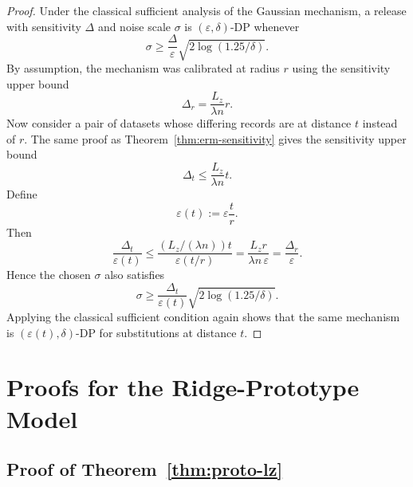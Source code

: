 \documentclass[conference,compsoc]{IEEEtran}
\begin{document}
\begin{proof}
Under the classical sufficient analysis of the Gaussian mechanism, a release with sensitivity $\Delta$ and noise scale $\sigma$ is $(\varepsilon,\delta)$-DP whenever
\[
\sigma\ge \frac{\Delta}{\varepsilon}\sqrt{2\log(1.25/\delta)}.
\]
By assumption, the mechanism was calibrated at radius $r$ using the sensitivity upper bound
\[
\Delta_r=\frac{L_z}{\lambda n}r.
\]
Now consider a pair of datasets whose differing records are at distance $t$ instead of $r$. The same proof as Theorem~\ref{thm:erm-sensitivity} gives the sensitivity upper bound
\[
\Delta_t\le \frac{L_z}{\lambda n}t.
\]
Define
\[
\varepsilon(t):=\varepsilon\frac{t}{r}.
\]
Then
\[
\frac{\Delta_t}{\varepsilon(t)}
\le
\frac{(L_z/(\lambda n))t}{\varepsilon(t/r)}
=
\frac{L_z r}{\lambda n\,\varepsilon}
=
\frac{\Delta_r}{\varepsilon}.
\]
Hence the chosen $\sigma$ also satisfies
\[
\sigma\ge \frac{\Delta_t}{\varepsilon(t)}\sqrt{2\log(1.25/\delta)}.
\]
Applying the classical sufficient condition again shows that the same mechanism is $(\varepsilon(t),\delta)$-DP for substitutions at distance $t$.
\end{proof}

\section{Proofs for the Ridge-Prototype Model}
\label{app:proof-ridge}

\subsection{Proof of Theorem~\ref{thm:proto-lz}}
\end{document}
